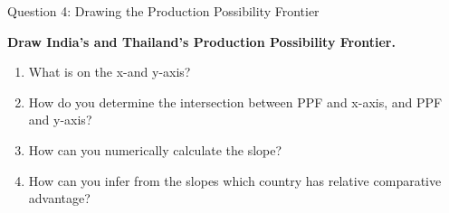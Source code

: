 \documentclass{beamer}
\begin{document}
\begin{frame}{Question 4: Drawing the Production Possibility Frontier}

\vspace{-0.2cm}

\textbf{Draw India's and Thailand's Production Possibility Frontier.}

\vspace{0.2cm}

\begin{enumerate}
    \item What is on the x-and y-axis?
    \item How do you determine the intersection between PPF and x-axis, and PPF and y-axis?
    \item How can you numerically calculate the slope?
    \item How can you infer from the slopes which country has relative comparative advantage?
\end{enumerate}

\end{frame}

\end{document}
